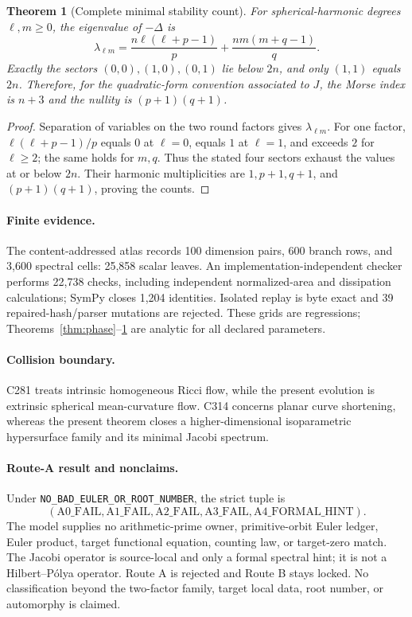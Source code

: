 \documentclass[10pt]{article}
\newtheorem{theorem}{Theorem}
\begin{document}
\begin{theorem}[Complete minimal stability count]\label{thm:spectrum}
For spherical-harmonic degrees $\ell,m\geq0$, the eigenvalue of $-\Delta$ is
\[
 \lambda_{\ell m}=\frac{n\ell(\ell+p-1)}p
 +\frac{nm(m+q-1)}q.
\]
Exactly the sectors $(0,0),(1,0),(0,1)$ lie below $2n$, and only $(1,1)$
equals $2n$.  Therefore, for the quadratic-form convention associated to
$J$, the Morse index is $n+3$ and the nullity is $(p+1)(q+1)$.
\end{theorem}
\begin{proof}
Separation of variables on the two round factors gives $\lambda_{\ell m}$.
For one factor, $\ell(\ell+p-1)/p$ equals $0$ at $\ell=0$, equals $1$ at
$\ell=1$, and exceeds $2$ for $\ell\geq2$; the same holds for $m,q$.
Thus the stated four sectors exhaust the values at or below $2n$.
Their harmonic multiplicities are $1,p+1,q+1$, and
$(p+1)(q+1)$, proving the counts.
\end{proof}

\paragraph{Finite evidence.}
The content-addressed atlas records 100 dimension pairs, 600 branch rows,
and 3,600 spectral cells: 25,858 scalar leaves.  An implementation-independent
checker performs 22,738 checks, including independent normalized-area and
dissipation calculations; SymPy closes 1,204 identities.  Isolated replay
is byte exact and 39 repaired-hash/parser mutations are rejected.  These
grids are regressions; Theorems~\ref{thm:phase}--\ref{thm:spectrum} are
analytic for all declared parameters.

\paragraph{Collision boundary.}
C281 treats intrinsic homogeneous Ricci flow, while the present evolution
is extrinsic spherical mean-curvature flow.  C314 concerns planar curve
shortening, whereas the present theorem closes a higher-dimensional
isoparametric hypersurface family and its minimal Jacobi spectrum.

\paragraph{Route-A result and nonclaims.}
Under \texttt{NO\_BAD\_EULER\_OR\_ROOT\_NUMBER}, the strict tuple is
\[
 (\mathrm{A0\_FAIL},\mathrm{A1\_FAIL},\mathrm{A2\_FAIL},
  \mathrm{A3\_FAIL},\mathrm{A4\_FORMAL\_HINT}).
\]
The model supplies no arithmetic-prime owner, primitive-orbit Euler ledger,
Euler product, target functional equation, counting law, or target-zero
match.  The Jacobi operator is source-local and only a formal spectral hint;
it is not a Hilbert--P\'olya operator.  Route A is rejected and Route B stays
locked.  No classification beyond the two-factor family, target local data,
root number, or automorphy is claimed.
\end{document}

